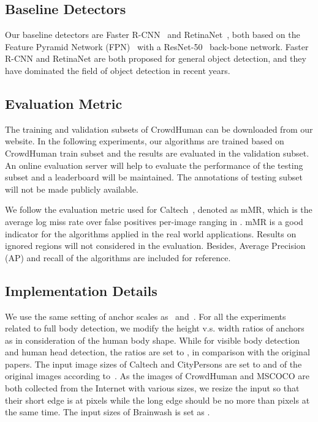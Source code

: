\documentclass[10pt,twocolumn,letterpaper]{article}
\begin{document}
\subsection{Baseline Detectors}
Our baseline detectors are Faster R-CNN~\cite{ren2015faster} and RetinaNet~\cite{lin2017focal}, both based on the Feature Pyramid Network (FPN)~\cite{lin2017feature} with a ResNet-50~\cite{he2016deep} back-bone network. Faster R-CNN and RetinaNet are both proposed for general object detection, and they have dominated the field of object detection in recent years. 




\subsection{Evaluation Metric}
The training and validation subsets of CrowdHuman can be downloaded from our website. In the following experiments, our algorithms are trained based on CrowdHuman train subset and the results are evaluated in the validation subset.  An online evaluation server will help to evaluate the performance of the testing subset and a leaderboard will be maintained. The annotations of testing subset will not be made publicly available.

We follow the evaluation metric used for Caltech~\cite{dollar2009pedestrian}, denoted as mMR, which is the average log miss rate over false positives per-image ranging in . mMR is a good indicator for the algorithms applied in the real world applications. Results on ignored regions will not considered in the evaluation. Besides, Average Precision (AP) and recall of the algorithms are included for reference.


\subsection{Implementation Details}
We use the same setting of anchor scales as~\cite{lin2017feature} and~\cite{lin2017focal}. For all the experiments related to full body detection, we modify the height v.s. width ratios of anchors as  in consideration of  the human body shape. While for visible body detection and human head detection, the ratios are set to , in comparison with the original papers. The input image sizes of Caltech and CityPersons are set to  and  of the original images according to~\cite{zhang2017citypersons}. As the images of CrowdHuman and MSCOCO are both collected from the Internet with various sizes, we resize the input so that their short edge is at  pixels while the long edge should be no more than  pixels at the same time. The input sizes of Brainwash is set as .
\end{document}
